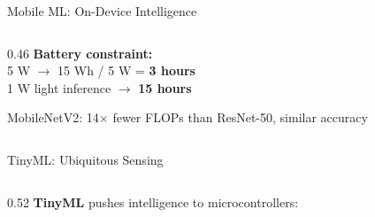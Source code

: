 \documentclass[aspectratio=169, 12pt]{beamer}
\begin{document}
\begin{frame}{Mobile ML: On-Device Intelligence}
\begin{columns}[T]
\begin{column}{0.46\textwidth}
    \vspace{0.1cm}
    \textbf{Battery constraint:}\\
    5 W $\to$ 15 Wh / 5 W = \textbf{3 hours}\\
    1 W light inference $\to$ \textbf{15 hours}

    \vspace{0.1cm}
    MobileNetV2: 14$\times$ fewer FLOPs than ResNet-50, similar accuracy
  \end{column}
\end{columns}

\end{frame}

\begin{frame}{TinyML: Ubiquitous Sensing}
\note{
%
%
%
%
}

\small
\begin{columns}[T]
  \begin{column}{0.52\textwidth}
    \textbf{TinyML} pushes intelligence to microcontrollers:


\end{column}
\end{columns}
\end{frame}
\end{document}
